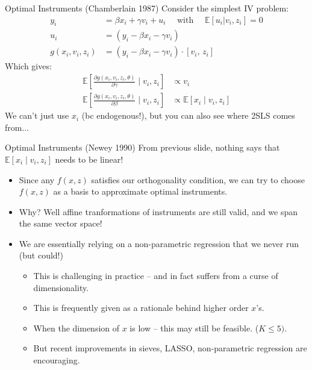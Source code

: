 \documentclass[aspectratio=169,10pt]{beamer}
\begin{document}
\begin{frame}{Optimal Instruments (Chamberlain 1987)}
Consider the simplest IV problem:
\begin{align*}
y_i &= \beta x_i + \gamma v_i + u_i \quad \text{ with } \quad \mathbb{E}[u_i | v_i, z_i] =0 \\
u_i &= \left(y_i - \beta x_i - \gamma v_i \right) \\
g(x_i,v_i,z_i) &= \left(y_i - \beta x_i - \gamma v_i \right) \cdot [v_i,\, z_i]
 \end{align*}
 Which gives:
\begin{align*}
\mathbb{E}\left[\frac{\partial g(x_i,v_i, z_i,\theta)}{\partial \gamma} \mid v_i, z_i \right] &\propto v_i\\
\mathbb{E}\left[\frac{\partial g(x_i,v_i, z_i,\theta)}{\partial \beta} \mid v_i, z_i \right] &
\propto \mathbb{E}\left[x_i \mid v_i, z_i \right]
\end{align*}
We can't just use $x_i$ (bc endogenous!), but you can also see where 2SLS comes from...
\end{frame}




\begin{frame}{Optimal Instruments (Newey 1990)}
From previous slide, nothing says that $\mathbb{E}\left[x_i \mid v_i, z_i \right]$ needs to be \alert{linear}!
\begin{itemize}
\item Since any $f(x,z)$ satisfies our orthogonality condition, we can try to choose $f(x,z)$ as a \alert{basis} to approximate optimal instruments.
\item Why? Well affine tranformations of instruments are still valid, and we span the same vector space!
\item We are essentially relying on a non-parametric regression that we never run (but could!)
\begin{itemize}
\item This is challenging in practice -- and in fact suffers from a curse of dimensionality.
\item This is frequently given as a rationale behind higher order $x$'s.
\item When the dimension of $x$ is low -- this may still be feasible. ($K \leq 5)$.
\item But recent improvements in sieves, LASSO, non-parametric regression are encouraging.
\end{itemize}
\end{itemize}
\end{frame}
\end{document}
